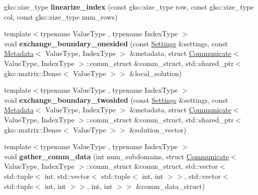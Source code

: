 \begin{DoxyCompactItemize}
\item 
\mbox{\label{namespaceSchwarzWrappers_a04eec9c45e6c8892a1f58f6e63bdb49e}} 
gko\+::size\+\_\+type {\bfseries linearize\+\_\+index} (const gko\+::size\+\_\+type row, const gko\+::size\+\_\+type col, const gko\+::size\+\_\+type num\+\_\+rows)
\item 
\mbox{\label{namespaceSchwarzWrappers_a641984e68102b3e16d20c78b94f5b92d}} 
{\footnotesize template$<$typename Value\+Type , typename Index\+Type $>$ }\\void {\bfseries exchange\+\_\+boundary\+\_\+onesided} (const \hyperlink{structSchwarzWrappers_1_1Settings}{Settings} \&settings, const \hyperlink{structSchwarzWrappers_1_1Metadata}{Metadata}$<$ Value\+Type, Index\+Type $>$ \&metadata, struct \hyperlink{classSchwarzWrappers_1_1Communicate}{Communicate}$<$ Value\+Type, Index\+Type $>$\+::comm\+\_\+struct \&comm\+\_\+struct, std\+::shared\+\_\+ptr$<$ gko\+::matrix\+::\+Dense$<$ Value\+Type $>$$>$ \&local\+\_\+solution)
\item 
\mbox{\label{namespaceSchwarzWrappers_ac82621175e8aa5923f753c0a31ea3a0e}} 
{\footnotesize template$<$typename Value\+Type , typename Index\+Type $>$ }\\void {\bfseries exchange\+\_\+boundary\+\_\+twosided} (const \hyperlink{structSchwarzWrappers_1_1Settings}{Settings} \&settings, const \hyperlink{structSchwarzWrappers_1_1Metadata}{Metadata}$<$ Value\+Type, Index\+Type $>$ \&metadata, struct \hyperlink{classSchwarzWrappers_1_1Communicate}{Communicate}$<$ Value\+Type, Index\+Type $>$\+::comm\+\_\+struct \&comm\+\_\+struct, std\+::shared\+\_\+ptr$<$ gko\+::matrix\+::\+Dense$<$ Value\+Type $>$$>$ \&solution\+\_\+vector)
\item 
\mbox{\label{namespaceSchwarzWrappers_ac3ea813e7def5dd435b215ff2a2dadaa}} 
{\footnotesize template$<$typename Value\+Type , typename Index\+Type $>$ }\\void {\bfseries gather\+\_\+comm\+\_\+data} (int num\+\_\+subdomains, struct \hyperlink{classSchwarzWrappers_1_1Communicate}{Communicate}$<$ Value\+Type, Index\+Type $>$\+::comm\+\_\+struct \&comm\+\_\+struct, std\+::vector$<$ std\+::tuple$<$ int, std\+::vector$<$ std\+::tuple$<$ int, int $>$$>$, std\+::vector$<$ std\+::tuple$<$ int, int $>$$>$, int, int $>$$>$ \&comm\+\_\+data\+\_\+struct)
$$
\end{DoxyCompactItemize}
